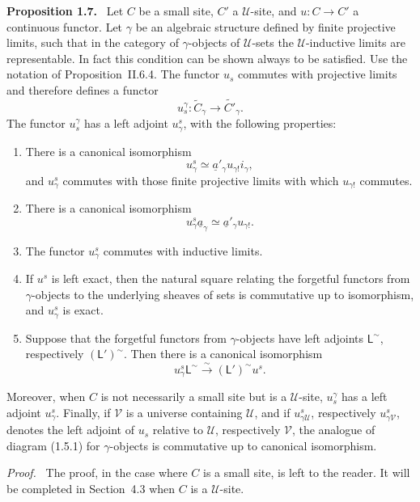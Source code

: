 \documentclass[11pt]{article}
\newcommand{\U}{\mathcal{U}}
\newcommand{\V}{\mathcal{V}}
\newenvironment{statement}[1]{\par\medskip\noindent\textbf{#1.}\ }{\par\medskip}
\newenvironment{prooftext}{\par\noindent\emph{Proof.}\ }{\par\medskip}
\begin{document}
\begin{statement}{Proposition 1.7}
Let \(C\) be a small site, \(C'\) a \(\U\)-site, and \(u:C\to C'\) a continuous functor. Let \(\gamma\) be an algebraic structure defined by finite projective limits, such that in the category of \(\gamma\)-objects of \(\U\)-sets the \(\U\)-inductive limits are representable. In fact this condition can be shown always to be satisfied. Use the notation of Proposition~II.6.4. The functor \(u_s\) commutes with projective limits and therefore defines a functor
\[
u_s^\gamma:\widetilde C_\gamma\to\widetilde{C'}_\gamma.
\]
The functor \(u_s^\gamma\) has a left adjoint \(u^s_\gamma\), with the following properties:
\begin{enumerate}[label=\arabic*)]
\item There is a canonical isomorphism
\[
u^s_\gamma\simeq \underline a'_\gamma u_{\gamma!}i_\gamma,
\]
and \(u^s_\gamma\) commutes with those finite projective limits with which \(u_{\gamma!}\) commutes.
\item There is a canonical isomorphism
\[
u^s_\gamma\underline a_\gamma\simeq\underline a'_\gamma u_{\gamma!}.
\]
\item The functor \(u^s_\gamma\) commutes with inductive limits.
\item If \(u^s\) is left exact, then the natural square relating the forgetful functors from \(\gamma\)-objects to the underlying sheaves of sets is commutative up to isomorphism, and \(u^s_\gamma\) is exact.
\item Suppose that the forgetful functors from \(\gamma\)-objects have left adjoints \(\mathsf L^{\sim}\), respectively \((\mathsf L')^{\sim}\). Then there is a canonical isomorphism
\[
u^s_\gamma\mathsf L^{\sim}\xrightarrow{\sim}(\mathsf L')^{\sim}u^s.
\]
\end{enumerate}
Moreover, when \(C\) is not necessarily a small site but is a \(\U\)-site, \(u_s^\gamma\) has a left adjoint \(u^s_\gamma\). Finally, if \(\V\) is a universe containing \(\U\), and if \(u^s_{\gamma\U}\), respectively \(u^s_{\gamma\V}\), denotes the left adjoint of \(u_s\) relative to \(\U\), respectively \(\V\), the analogue of diagram (1.5.1) for \(\gamma\)-objects is commutative up to canonical isomorphism.
\end{statement}

\begin{prooftext}
The proof, in the case where \(C\) is a small site, is left to the reader. It will be completed in Section~4.3 when \(C\) is a \(\U\)-site.
\end{prooftext}
\end{document}
